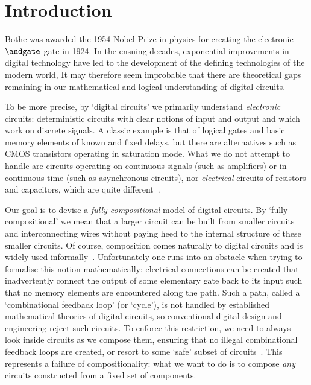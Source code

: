 \documentclass{lmcs}
\begin{document}
\section{Introduction}

Bothe was awarded the 1954 Nobel Prize in physics for creating the electronic
\(\andgate\) gate in 1924.
In the ensuing decades, exponential improvements in digital technology have led
to the development of the defining technologies of the modern world,
It may therefore seem improbable that there are theoretical gaps remaining in
our mathematical and logical understanding of digital circuits.

To be more precise, by `digital circuits' we primarily understand
\emph{electronic} circuits: deterministic circuits with clear notions of
input and output and which work on discrete signals.
A classic example is that of logical gates and basic memory elements of known
and fixed delays, but there are alternatives such as CMOS transistors operating
in saturation mode.
What we do not attempt to handle are circuits operating on continuous signals
(such as amplifiers) or in continuous time (such as asynchronous circuits), nor
\emph{electrical} circuits of resistors and capacitors, which are quite
different~\cite{boisseau2022string}.

Our goal is to devise a \emph{fully compositional} model of digital circuits.
By `fully compositional' we mean that a larger circuit can be built from smaller
circuits and interconnecting wires without paying heed to the internal structure
of these smaller circuits.
Of course, composition comes naturally to digital circuits and is widely used
informally~\cite{gordon1982model}.
Unfortunately one runs into an obstacle when trying to formalise this notion
mathematically: electrical connections can be created that inadvertently
connect the output of some elementary gate back to
its input such that no memory elements are encountered along the path.
Such a path, called a `combinational feedback loop' (or `cycle'), is not handled
by established mathematical theories of digital circuits, so conventional
digital design and engineering reject such circuits.
To enforce this restriction, we need to always look inside circuits as we
compose them, ensuring that no illegal combinational feedback loops are created,
or resort to some `safe' subset of circuits~\cite{christensen2021wire}.
This represents a failure of compositionality: what we want to do is to compose
\emph{any} circuits constructed from a fixed set of components.
\end{document}
